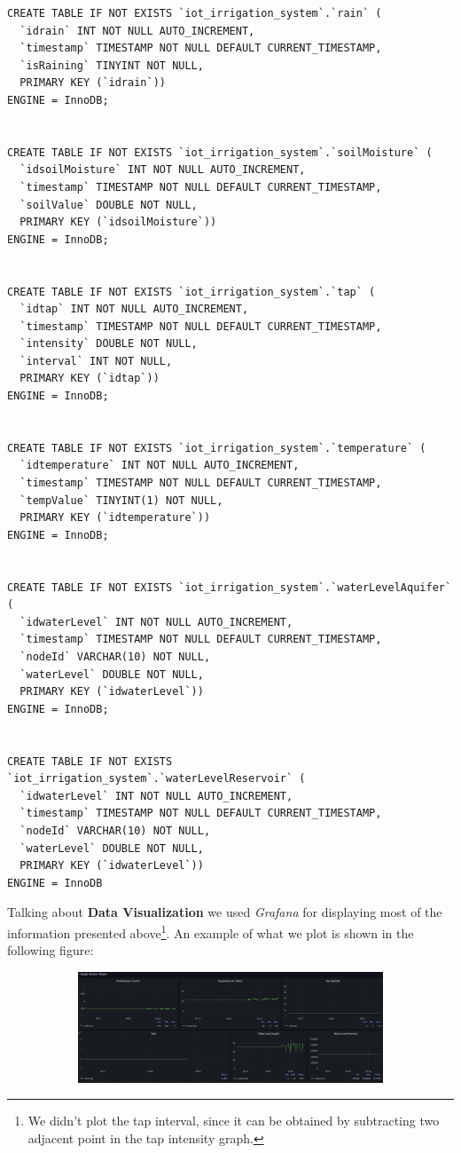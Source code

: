 \begin{verbatim}
CREATE TABLE IF NOT EXISTS `iot_irrigation_system`.`rain` (
  `idrain` INT NOT NULL AUTO_INCREMENT,
  `timestamp` TIMESTAMP NOT NULL DEFAULT CURRENT_TIMESTAMP,
  `isRaining` TINYINT NOT NULL,
  PRIMARY KEY (`idrain`))
ENGINE = InnoDB;


CREATE TABLE IF NOT EXISTS `iot_irrigation_system`.`soilMoisture` (
  `idsoilMoisture` INT NOT NULL AUTO_INCREMENT,
  `timestamp` TIMESTAMP NOT NULL DEFAULT CURRENT_TIMESTAMP,
  `soilValue` DOUBLE NOT NULL,
  PRIMARY KEY (`idsoilMoisture`))
ENGINE = InnoDB;


CREATE TABLE IF NOT EXISTS `iot_irrigation_system`.`tap` (
  `idtap` INT NOT NULL AUTO_INCREMENT,
  `timestamp` TIMESTAMP NOT NULL DEFAULT CURRENT_TIMESTAMP,
  `intensity` DOUBLE NOT NULL,
  `interval` INT NOT NULL,
  PRIMARY KEY (`idtap`))
ENGINE = InnoDB;


CREATE TABLE IF NOT EXISTS `iot_irrigation_system`.`temperature` (
  `idtemperature` INT NOT NULL AUTO_INCREMENT,
  `timestamp` TIMESTAMP NOT NULL DEFAULT CURRENT_TIMESTAMP,
  `tempValue` TINYINT(1) NOT NULL,
  PRIMARY KEY (`idtemperature`))
ENGINE = InnoDB;


CREATE TABLE IF NOT EXISTS `iot_irrigation_system`.`waterLevelAquifer` (
  `idwaterLevel` INT NOT NULL AUTO_INCREMENT,
  `timestamp` TIMESTAMP NOT NULL DEFAULT CURRENT_TIMESTAMP,
  `nodeId` VARCHAR(10) NOT NULL,
  `waterLevel` DOUBLE NOT NULL,
  PRIMARY KEY (`idwaterLevel`))
ENGINE = InnoDB;


CREATE TABLE IF NOT EXISTS `iot_irrigation_system`.`waterLevelReservoir` (
  `idwaterLevel` INT NOT NULL AUTO_INCREMENT,
  `timestamp` TIMESTAMP NOT NULL DEFAULT CURRENT_TIMESTAMP,
  `nodeId` VARCHAR(10) NOT NULL,
  `waterLevel` DOUBLE NOT NULL,
  PRIMARY KEY (`idwaterLevel`))
ENGINE = InnoDB
\end{verbatim}


Talking about \textbf{Data Visualization} we used \textit{Grafana} for displaying most of the information presented above\footnote{We didn't plot the tap interval, since it can be obtained by subtracting two adjacent point in the tap intensity graph.}. An example of what we plot is shown in the following figure:

\begin{figure}[H]
	\begin{subfigure}{\textwidth}
	\centering
		\includegraphics[width=.83\linewidth]{img/grafana.png} 
	\end{subfigure}
\end{figure}


